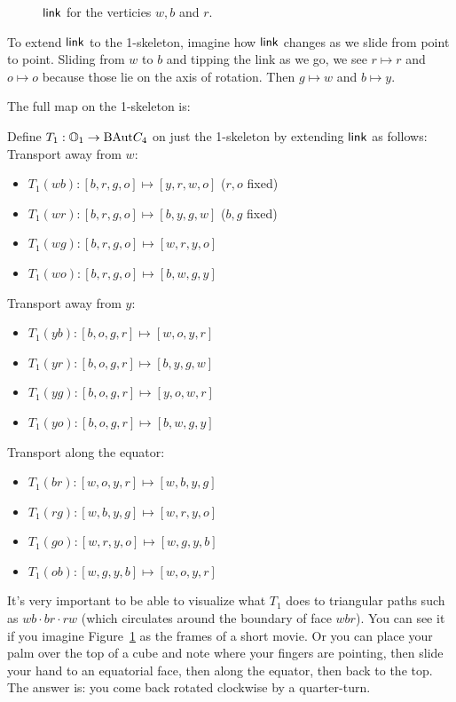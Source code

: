 \begin{figure}[htbp]
\centering

\caption{\( \mathsf{link} \) for the verticies \( w, b\) and \( r \).}
\label{fig:triangle_of_equators}
\end{figure}

To extend \( \mathsf{link} \) to the 1-skeleton, imagine how \( \mathsf{link} \) changes as we slide from point to point. Sliding from \( w \) to \( b \) and tipping the link as we go, we see \( r\mapsto r \) and \( o\mapsto o \) because those lie on the axis of rotation. Then \( g\mapsto w \) and \( b\mapsto y \). 

The full map on the 1-skeleton is:
\begin{mydef}
Define \( T_1:\mathbb{O}_1\to\mathrm{BAut} C_4 \) on just the 1-skeleton by extending \( \mathsf{link} \) as follows:
Transport away from \( w \):
\begin{itemize}
\item \( T_1(wb):[b, r, g, o]\mapsto [y, r, w, o] \) (\( r, o \) fixed)
\item \( T_1(wr):[b, r, g, o]\mapsto [b, y, g, w] \) (\( b, g \) fixed)
\item \( T_1(wg):[b, r, g, o]\mapsto [w, r, y, o] \)
\item \( T_1(wo):[b, r, g, o]\mapsto [b, w, g, y] \)
\end{itemize}
Transport away from \( y \):
\begin{itemize}
\item \( T_1(yb):[b, o, g, r]\mapsto [w, o, y, r] \)
\item \( T_1(yr):[b, o, g, r]\mapsto [b, y, g, w] \)
\item \( T_1(yg):[b, o, g, r]\mapsto [y, o, w, r] \)
\item \( T_1(yo):[b, o, g, r]\mapsto [b, w, g, y] \)
\end{itemize}
Transport along the equator:
\begin{itemize}
\item \( T_1(br):[w, o, y, r]\mapsto [w, b, y, g] \) 
\item \( T_1(rg):[w, b, y, g]\mapsto [w, r, y, o] \)
\item \( T_1(go):[w, r, y, o]\mapsto [w, g, y, b] \)
\item \( T_1(ob):[w, g, y, b]\mapsto [w, o, y, r] \)
\end{itemize}
\end{mydef}

It's very important to be able to visualize what \( T_1 \) does to triangular paths such as \( wb\cdot br\cdot rw \) (which circulates around the boundary of face \( wbr \)). You can see it if you imagine Figure~\ref{fig:triangle_of_equators} as the frames of a short movie. Or you can place your palm over the top of a cube and note where your fingers are pointing, then slide your hand to an equatorial face, then along the equator, then back to the top. The answer is: you come back rotated clockwise by a quarter-turn. 

